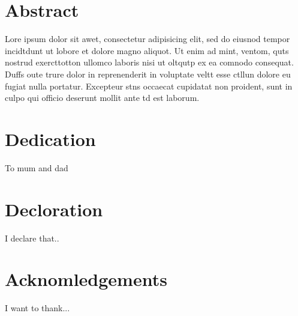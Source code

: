 \chapter*{Abstract} Lore ipsum dolor sit awet, consectetur adipisicing elit, sed do eiusnod tempor incidtdunt ut lobore et dolore magno aliquot. Ut enim ad mint, ventom, quts nostrud exercttotton ullomco laboris nisi ut oltqutp ex ea comnodo consequat. Duffs oute trure dolor in reprenenderit in voluptate veltt esse ctllun dolore eu fugiat nulla portatur. Excepteur stns occaecat cupidatat non proident, sunt in culpo qui officio deserunt mollit ante td est laborum. 
\chapter*{Dedication} To mum and dad 
\chapter*{Decloration} I declare that.. 
\chapter*{Acknomledgements} I want to thank... 